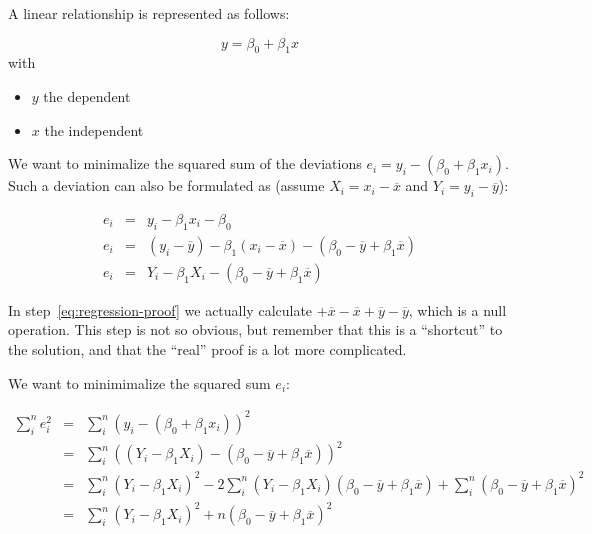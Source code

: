 \begin{theorem}

  A linear relationship is represented as follows:

  \begin{equation}
    y = \beta_{0} + \beta_{1} x
    \label{eq:lineair}
  \end{equation}
  with
  \begin{itemize}
    \item $y$ the dependent
    \item $x$ the independent
  \end{itemize}

  We want to minimalize the squared sum of the deviations $e_{i} = y_{i} - (\beta_{0} + \beta_{1}x_{i})$. Such a deviation can also be formulated as (assume $X_{i} = x_{i} - \overline{x}$ and $Y_{i} = y_{i} - \overline{y}$):

  \begin{eqnarray}
    e_{i} & = & y_{i} - \beta_{1} x_{i} - \beta_{0} \\
    e_{i} & = & (y_{i} - \overline{y}) - \beta_{1}(x_{i} - \overline{x}) - (\beta_{0} - \overline{y} + \beta_{1} \overline{x}) \\
    \label{eq:regression-proof}
    e_{i} & = & Y_{i} - \beta_{1} X_{i} - (\beta_{0} - \overline{y} + \beta_{1} \overline{x})
  \end{eqnarray}

  In step~\ref{eq:regression-proof} we actually calculate $+\overline{x}-\overline{x}+\overline{y}-\overline{y}$, which is a null operation. This step is not so obvious, but remember that this is a ``shortcut'' to the solution, and that the ``real'' proof is a lot more complicated.

  We want to minimimalize the squared sum $e_i$:

  \begin{eqnarray}
    \sum_{i}^{n} e_{i}^{2} & =& \sum_{i}^{n} (y_{i} - (\beta_{0} + \beta_{1}x_{i}))^{2}\\
    & = & \sum_{i}^{n} ((Y_{i} - \beta_{1} X_{i}) - (\beta_{0} - \overline{y} + \beta_{1}\overline{x}))^{2}\\
    & = & \sum_{i}^{n}(Y_{i} - \beta_{1} X_{i})^2 - 2 \sum_{i}^{n}(Y_i - \beta_1 X_i)(\beta_0 - \overline{y}+ \beta_1\overline{x}) + \sum_{i}^{n}(\beta_{0} - \overline{y} + \beta_{1}\overline{x})^{2} \label{eq:step1}\\
    & = & \sum_{i}^{n}(Y_{i} - \beta_{1} X_{i})^{2} + n(\beta_{0} - \overline{y} + \beta_{1} \overline{x})^{2} \label{eq:step2}
  \end{eqnarray}


\end{theorem}
